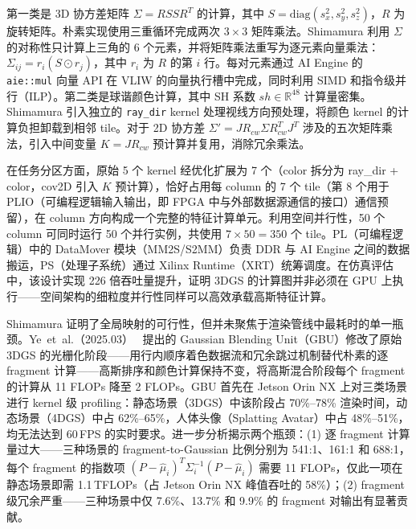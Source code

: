 第一类是 3D 协方差矩阵 $\Sigma=RSSR^T$ 的计算，其中 $S=\mathrm{diag}(s_x^2, s_y^2, s_z^2)$，$R$ 为旋转矩阵。朴素实现使用三重循环完成两次 $3\times 3$ 矩阵乘法。Shimamura 利用 $\Sigma$ 的对称性只计算上三角的 6 个元素，并将矩阵乘法重写为逐元素向量乘法：$\Sigma_{ij}=r_i(S \odot r_j)$，其中 $r_i$ 为 $R$ 的第 $i$ 行。每对元素通过 AI Engine 的 \texttt{aie::mul} 向量 API 在 VLIW 的向量执行槽中完成，同时利用 SIMD 和指令级并行（ILP）。第二类是球谐颜色计算，其中 SH 系数 $sh\in\mathbb{R}^{48}$ 计算量密集。Shimamura 引入独立的 \texttt{ray\_dir} kernel 处理视线方向预处理，将颜色 kernel 的计算负担卸载到相邻 tile。对于 2D 协方差 $\Sigma'=JR_{cw}\Sigma R_{cw}^TJ^T$ 涉及的五次矩阵乘法，引入中间变量 $K=JR_{cw}$ 预计算并复用，消除冗余乘法。

在任务分区方面，原始 5 个 kernel 经优化扩展为 7 个（color 拆分为 ray\_dir + color，cov2D 引入 $K$ 预计算），恰好占用每 column 的 7 个 tile（第 8 个用于 PLIO（可编程逻辑输入输出，即 FPGA 中与外部数据源通信的接口）通信预留），在 column 方向构成一个完整的特征计算单元。利用空间并行性，50 个 column 可同时运行 50 个并行实例，共使用 $7\times 50=350$ 个 tile。PL（可编程逻辑）中的 DataMover 模块（MM2S/S2MM）负责 DDR 与 AI Engine 之间的数据搬运，PS（处理子系统）通过 Xilinx Runtime（XRT）统筹调度。在仿真评估中，该设计实现 226 倍吞吐量提升，证明 3DGS 的计算图并非必须在 GPU 上执行——空间架构的细粒度并行性同样可以高效承载高斯特征计算。

Shimamura 证明了全局映射的可行性，但并未聚焦于渲染管线中最耗时的单一瓶颈。Ye~et~al.（2025.03）~\cite{2503_23625} 提出的 Gaussian Blending Unit（GBU）修改了原始 3DGS 的光栅化阶段——用行内顺序着色数据流和冗余跳过机制替代朴素的逐 fragment 计算——高斯排序和颜色计算保持不变，将高斯混合阶段每个 fragment 的计算从 11 FLOPs 降至 2 FLOPs。GBU 首先在 Jetson Orin NX 上对三类场景进行 kernel 级 profiling：静态场景（3DGS）中该阶段占 70\%--78\% 渲染时间，动态场景（4DGS）中占 62\%--65\%，人体头像（Splatting Avatar）中占 48\%--51\%，均无法达到 60\,FPS 的实时要求。进一步分析揭示两个瓶颈：(1) 逐 fragment 计算量过大——三种场景的 fragment-to-Gaussian 比例分别为 541:1、161:1 和 688:1，每个 fragment 的指数项 $(P-\hat{\mu}_i)^T\Sigma_i^{-1}(P-\hat{\mu}_i)$ 需要 11 FLOPs，仅此一项在静态场景即需 1.1\,TFLOPs（占 Jetson Orin NX 峰值吞吐的 58\%）；(2) fragment 级冗余严重——三种场景中仅 7.6\%、13.7\% 和 9.9\% 的 fragment 对输出有显著贡献。


